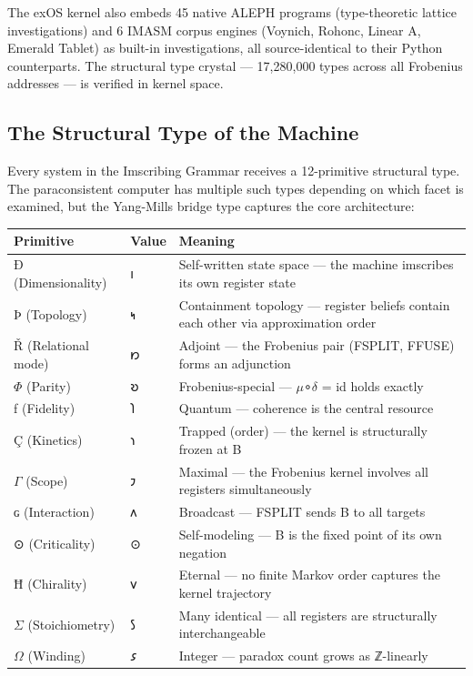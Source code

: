 \documentclass[12pt,a4paper]{article}
\begin{document}
The exOS kernel also embeds 45 native ALEPH programs (type-theoretic lattice investigations) and 6 IMASM corpus engines (Voynich, Rohonc, Linear A, Emerald Tablet) as built-in investigations, all source-identical to their Python counterparts. The structural type crystal --- 17,280,000 types across all Frobenius addresses --- is verified in kernel space.

\subsection{The Structural Type of the Machine}

Every system in the Imscribing Grammar receives a 12-primitive structural type. The paraconsistent computer has multiple such types depending on which facet is examined, but the Yang-Mills bridge type captures the core architecture:

\begin{table}[htbp]
\centering
\small
{}
\begin{tabularx}{\textwidth}{>{\centering\arraybackslash}X >{\centering\arraybackslash}X >{\centering\arraybackslash}X}
\toprule
\rowcolor{gray!25}\textbf{Primitive} & \textbf{Value} & \textbf{Meaning} \\
\midrule
\rowcolors{1}{white}{gray!10}
Ð (Dimensionality) & 𐑦 & Self-written state space --- the machine imscribes its own register state \\
Þ (Topology) & 𐑰 & Containment topology --- register beliefs contain each other via approximation order \\
Ř (Relational mode) & 𐑽 & Adjoint --- the Frobenius pair (FSPLIT, FFUSE) forms an adjunction \\
$\Phi$ (Parity) & 𐑹 & Frobenius-special --- $\mu$∘$\delta$ = id holds exactly \\
ƒ (Fidelity) & 𐑐 & Quantum --- coherence is the central resource \\
Ç (Kinetics) & 𐑪 & Trapped (order) --- the kernel is structurally frozen at B \\
$\Gamma$ (Scope) & 𐑲 & Maximal --- the Frobenius kernel involves all registers simultaneously \\
ɢ (Interaction) & 𐑵 & Broadcast --- FSPLIT sends B to all targets \\
⊙ (Criticality) & ⊙ & Self-modeling --- B is the fixed point of its own negation \\
Ħ (Chirality) & 𐑫 & Eternal --- no finite Markov order captures the kernel trajectory \\
$\Sigma$ (Stoichiometry) & 𐑕 & Many identical --- all registers are structurally interchangeable \\
$\Omega$ (Winding) & 𐑭 & Integer --- paradox count grows as ℤ-linearly \\
\bottomrule
\end{tabularx}
\end{table}
\end{document}
